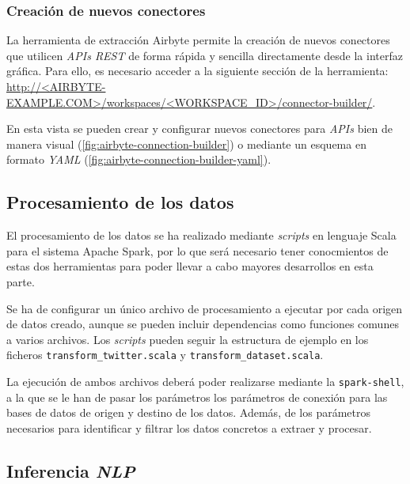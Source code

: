 \subsubsection{Creación de nuevos conectores}

La herramienta de extracción Airbyte permite la creación de nuevos conectores que utilicen \textit{APIs REST} de forma rápida y sencilla directamente desde la interfaz gráfica. Para ello, es necesario acceder a la siguiente sección de la herramienta: \url{http://<AIRBYTE-EXAMPLE.COM>/workspaces/<WORKSPACE_ID>/connector-builder/}.

En esta vista se pueden crear y configurar nuevos conectores para \textit{APIs} bien de manera visual (\autoref{fig:airbyte-connection-builder}) o mediante un esquema en formato \textit{YAML} (\autoref{fig:airbyte-connection-builder-yaml}).



\subsection{Procesamiento de los datos}

El procesamiento de los datos se ha realizado mediante \textit{scripts} en lenguaje Scala para el sistema Apache Spark, por lo que será necesario tener conocmientos de estas dos herramientas para poder llevar a cabo mayores desarrollos en esta parte.

Se ha de configurar un único archivo de procesamiento a ejecutar por cada origen de datos creado, aunque se pueden incluir dependencias como funciones comunes a varios archivos. Los \textit{scripts} pueden seguir la estructura de ejemplo en los ficheros \texttt{transform\_twitter.scala} y \texttt{transform\_dataset.scala}.

La ejecución de ambos archivos deberá poder realizarse mediante la \texttt{spark-shell}, a la que se le han de pasar los parámetros los parámetros de conexión para las bases de datos de origen y destino de los datos. Además, de los parámetros necesarios para identificar y filtrar los datos concretos a extraer y procesar.

\subsection{Inferencia \textit{NLP}}


